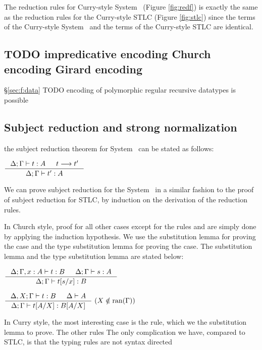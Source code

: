 The reduction rules for Curry-style System \F\ (Figure \ref{fig:redf})
is exactly the same as the reduction rules for the Curry-style STLC
(Figure \ref{fig:stlc}) since the terms of the Curry-style System \F\
and the terms of the Curry-style STLC are identical.

\subsection{TODO impredicative encoding Church encoding Girard encoding}
\S\ref{sec:f:data}
TODO encoding of polymorphic regular recursive datatypes is possible

\subsection{Subject reduction and strong normalization}\label{sec:f:srsn}

the subject reduction theorem for System \F\ can be stated as follows:
\begin{theorem}
$\inference{\Delta;\Gamma |- t : A  & t --> t'}{\Delta;\Gamma |- t' : A}$
\end{theorem}
We can prove subject reduction for the System \F\, in a similar fashion
to the proof of subject reduction for STLC,
by induction on the derivation of the reduction rules.

In Church style, proof for all other cases except for the rules
 and  are simply done by applying
the induction hypothesis. We use the substitution lemma for proving
the \rulename{RedBeta} case and the type substitution lemma for
proving the  case. The substitution lemma and
the type substitution lemma are stated below:

\begin{lemma}[substitution]
$ \inference{\Delta;\Gamma,x:A |- t : B  & \Delta;\Gamma |- s : A}
	{\Delta;\Gamma |- t[s/x] : B} $
\end{lemma}

\begin{lemma}
$ \inference{\Delta,X;\Gamma |- t : B  & \Delta |- A}
	{\Delta;\Gamma |- t[A/X] : B[A/X]} ~ (X\notin\ran(\Gamma))$
\end{lemma}

In Curry style, the most interesting case is the  rule,
which we the substitution lemma to prove.
The other rules 
The only complication we have,
compared to STLC, is that the typing rules are not syntax directed 

